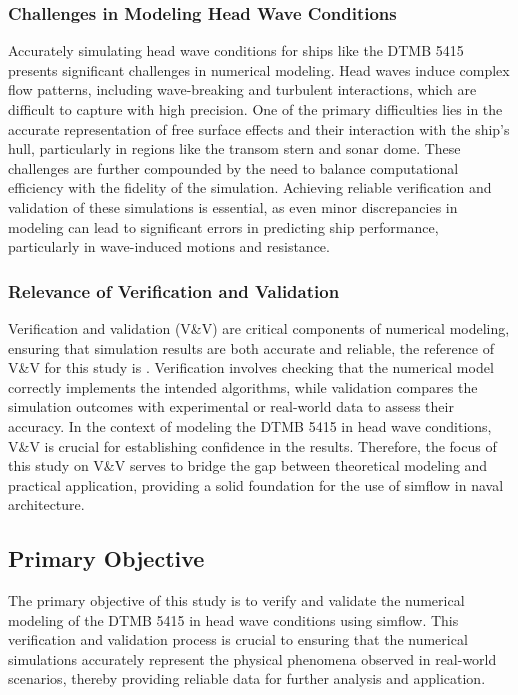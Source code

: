 \documentclass[12pt]{article} %
\begin{document}
\subsubsection{Challenges in Modeling Head Wave Conditions}
Accurately simulating head wave conditions for ships like the DTMB 5415 presents significant 
challenges in numerical modeling. Head waves induce complex flow patterns, including wave-breaking 
and turbulent interactions, which are difficult to capture with high precision. One of the primary 
difficulties lies in the accurate representation of free surface effects and their interaction with 
the ship's hull, particularly in regions like the transom stern and sonar dome. These challenges are 
further compounded by the need to balance computational efficiency with the fidelity of the simulation. 
Achieving reliable verification and validation of these simulations is essential, as even minor 
discrepancies in modeling can lead to significant errors in predicting ship performance, particularly 
in wave-induced motions and resistance.

\subsubsection{Relevance of Verification and Validation}
Verification and validation (V\&V) are critical components of numerical modeling, ensuring that 
simulation results are both accurate and reliable, the reference of V\&V for this study is \cite{Begovic2017}. 
Verification involves checking that the 
numerical model correctly implements the intended algorithms, while validation compares the 
simulation outcomes with experimental or real-world data to assess their accuracy. In the 
context of modeling the DTMB 5415 in head wave conditions, V\&V is crucial for establishing 
confidence in the results.
Therefore, the focus of this study on V\&V serves to bridge the gap between theoretical modeling 
and practical application, providing a solid foundation for the use of simflow in naval architecture.

\subsection{Primary Objective}
The primary objective of this study is to verify and validate the numerical modeling of the DTMB 5415 
in head wave conditions using simflow. This verification and validation process is crucial to 
ensuring that the numerical simulations accurately represent the physical phenomena observed in 
real-world scenarios, thereby providing reliable data for further analysis and application.
\end{document}
